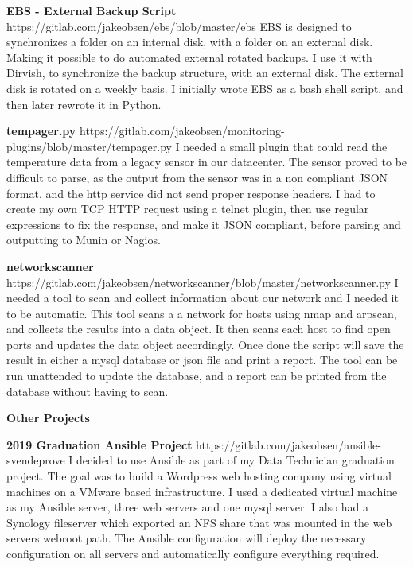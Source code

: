 \documentclass[11pt]{article}
\begin{document}
\textbf{EBS - External Backup Script}\newline
\textcolor{mygreen}{https://gitlab.com/jakeobsen/ebs/blob/master/ebs}\newline
EBS is designed to synchronizes a folder on an internal disk, with a folder on an external disk. Making it
possible to do automated external rotated backups. I use it with Dirvish, to synchronize the backup structure,
with an external disk. The external disk is rotated on a weekly basis. I initially wrote EBS as a bash shell
script, and then later rewrote it in Python.\newline

\textbf{tempager.py}\newline
\textcolor{mygreen}{https://gitlab.com/jakeobsen/monitoring-plugins/blob/master/tempager.py}\newline
I needed a small plugin that could read the temperature data from a legacy sensor in our datacenter. The sensor
proved to be difficult to parse, as the output from the sensor was in a non compliant JSON format, and the http
service did not send proper response headers. I had to create my own TCP HTTP request using a telnet plugin,
then use regular expressions to fix the response, and make it JSON compliant, before parsing and outputting to
Munin or Nagios.\newline

\textbf{networkscanner}\newline
\textcolor{mygreen}{https://gitlab.com/jakeobsen/networkscanner/blob/master/networkscanner.py}\newline
I needed a tool to scan and collect information about our network and I needed it to be automatic. This tool
scans a a network for hosts using nmap and arpscan, and collects the results into a data object. It then scans
each host to find open ports and updates the data object accordingly. Once done the script will save the result
in either a mysql database or json file and print a report. The tool can be run unattended to update the
database, and a report can be printed from the database without having to scan.\newline

\textcolor{mygreen}{{\fontsize{13}{16}\textbf{{Other Projects}}}}\newline

\textbf{2019      Graduation Ansible Project}\newline
\textcolor{mygreen}{https://gitlab.com/jakeobsen/ansible-svendeprove}\newline
I decided to use Ansible as part of my Data Technician graduation project.  The goal was to build a Wordpress
web hosting company using virtual machines on a VMware based infrastructure. I used  a dedicated virtual machine
as my Ansible server, three web servers and one mysql server. I also had a Synology fileserver which exported an
NFS share that was mounted in the web servers webroot path. The Ansible configuration will deploy the necessary
configuration on all servers and automatically configure everything required.\newline
\end{document}
